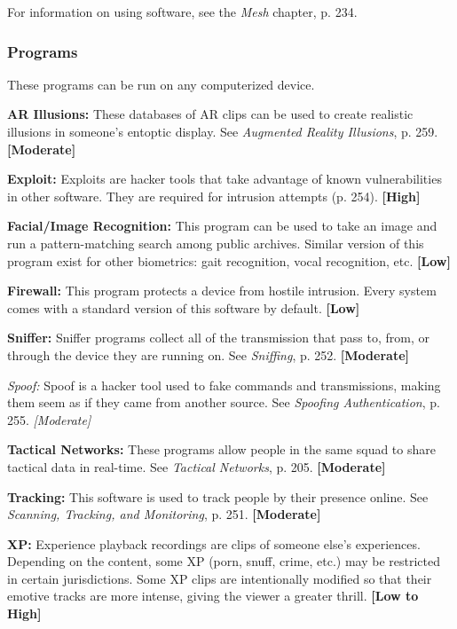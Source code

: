 For information on using software, see the \emph{Mesh} chapter, p. 234. 

\subsubsection{Programs} 

These programs can be run on any computerized device. 

\textbf{AR Illusions: }These databases of AR clips can be used to create realistic illusions in someone’s entoptic display. See \emph{Augmented Reality Illusions}, p. 259. \textbf{[Moderate]} 

\textbf{Exploit:} Exploits are hacker tools that take advantage of known vulnerabilities in other software. They are required for intrusion attempts (p. 254). \textbf{[High]} 

\textbf{Facial/Image Recognition:} This program can be used to take an image and run a pattern-matching search among public archives. Similar version of this program exist for other biometrics: gait recognition, vocal recognition, etc. \textbf{[Low]} 

\textbf{Firewall:} This program protects a device from hostile intrusion. Every system comes with a standard version of this software by default. \textbf{[Low]} 

\textbf{Sniffer:} Sniffer programs collect all of the transmission that pass to, from, or through the device they are running on. See \emph{Sniffing}, p. 252. \textbf{[Moderate]} 

\emph{Spoof:} Spoof is a hacker tool used to fake commands and transmissions, making them seem as if they came from another source. See \emph{Spoofing Authentication}, p. 255. \emph{[Moderate]} 

\textbf{Tactical Networks:} These programs allow people in the same squad to share tactical data in real-time. See \emph{Tactical Networks}, p. 205. \textbf{[Moderate]} 

\textbf{Tracking:} This software is used to track people by their presence online. See \emph{Scanning, Tracking, and Monitoring}, p. 251. \textbf{[Moderate]} 

\textbf{XP:} Experience playback recordings are clips of someone else’s experiences. Depending on the content, some XP (porn, snuff, crime, etc.) may be restricted in certain jurisdictions. Some XP clips are intentionally modified so that their emotive tracks are more intense, giving the viewer a greater thrill. \textbf{[Low to High]} 

